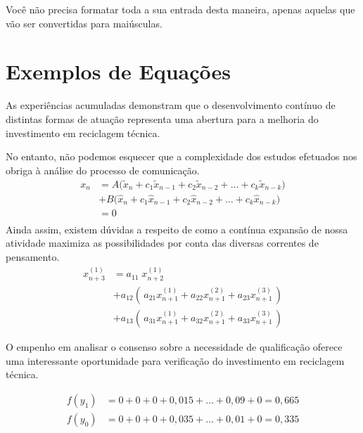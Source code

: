 \begin{apendicesenv}
    Você não precisa formatar toda a sua entrada desta maneira,
    apenas aquelas que vão ser convertidas para maiúsculas.

    \chapter{Exemplos de Equações}
    \label{chap_exemplos_equacoes}

    As experiências acumuladas demonstram que o desenvolvimento contínuo de
    distintas formas de atuação representa uma abertura para a melhoria do
    investimento em reciclagem técnica.

    No entanto, não podemos esquecer que a complexidade dos estudos efetuados nos
    obriga à análise do processo de comunicação.
    \[
        \begin{split}
            x_n & = A \big( \tilde{x}_n + c_1\tilde{x}_{n-1} + c_2\tilde{x}_{n-2} + \dots + c_k\tilde{x}_{n-k} \big) \\
            & + B \big(   \hat{x}_n + c_1  \hat{x}_{n-1} + c_2  \hat{x}_{n-2} + \dots + c_k  \hat{x}_{n-k} \big) \\
            & = 0 \\
        \end{split}
    \]
    Ainda assim, existem dúvidas a respeito de como a contínua expansão de nossa
    atividade maximiza as possibilidades por conta das diversas correntes de
    pensamento.
    \begin{equation}
        \begin{split}
            x_{n+3}^{(1)} & = a_{11}\; x_{n+2}^{(1)}                                                                  \\[2mm]
            & + a_{12} \left( \, a_{21}x_{n+1}^{(1)}+a_{22}x_{n+1}^{(2)}+a_{23}x_{n+1}^{(3)} \, \right) \\[2mm]
            & + a_{13} \left( \, a_{31}x_{n+1}^{(1)}+a_{32}x_{n+1}^{(2)}+a_{33}x_{n+1}^{(3)} \, \right)
        \end{split}
    \end{equation}

    O empenho em analisar o consenso sobre a necessidade de qualificação oferece uma
    interessante oportunidade para verificação do investimento em reciclagem
    técnica.

    \begin{align*}
        f(y_1) & = 0 + 0 + 0 + 0,015 + \dots + 0,09 + 0 = 0,665 \\
        f(y_0) & = 0 + 0 + 0 + 0,035 + \dots + 0,01 + 0 = 0,335
    \end{align*}


\end{apendicesenv}
